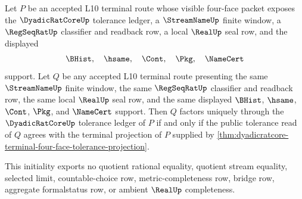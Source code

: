 \begin{theorem}
\label{thm:dyadicratcore-terminal-tolerance-pullback-initiality}
Let $P$ be an accepted L10 terminal route whose visible four-face packet exposes the $\DyadicRatCoreUp$ tolerance ledger, a $\StreamNameUp$ finite window, a $\RegSeqRatUp$ classifier and readback row, a local $\RealUp$ seal row, and the displayed
$$
\BHist,\quad \hsame,\quad \Cont,\quad \Pkg,\quad \NameCert
$$
support. Let $Q$ be any accepted L10 terminal route presenting the same $\StreamNameUp$ finite window, the same $\RegSeqRatUp$ classifier and readback row, the same local $\RealUp$ seal row, and the same displayed $\BHist$, $\hsame$, $\Cont$, $\Pkg$, and $\NameCert$ support. Then $Q$ factors uniquely through the $\DyadicRatCoreUp$ tolerance ledger of $P$ if and only if the public tolerance read of $Q$ agrees with the terminal projection of $P$ supplied by \autoref{thm:dyadicratcore-terminal-four-face-tolerance-projection}.

This initiality exports no quotient rational equality, quotient stream equality, selected limit, countable-choice row, metric-completeness row, bridge row, aggregate formalstatus row, or ambient $\RealUp$ completeness.
\end{theorem}
